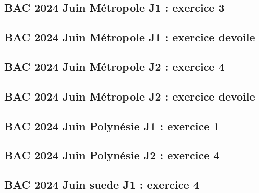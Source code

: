 \documentclass[lang=fr,edition=teacher,layout=sheet]{mxbook}
\begin{document}
\begingroup\endgroup
\par\bigskip
{}\subsection*{BAC 2024 Juin Métropole J1 : exercice 3}
\begingroup\endgroup
\par\bigskip
{}\subsection*{BAC 2024 Juin Métropole J1 : exercice devoile}
\begingroup\endgroup
\par\bigskip
{}\subsection*{BAC 2024 Juin Métropole J2 : exercice 4}
\begingroup\endgroup
\par\bigskip
{}\subsection*{BAC 2024 Juin Métropole J2 : exercice devoile}
\begingroup\endgroup
\par\bigskip
{}\subsection*{BAC 2024 Juin Polynésie J1 : exercice 1}
\begingroup\endgroup
\par\bigskip
{}\subsection*{BAC 2024 Juin Polynésie J2 : exercice 4}
\begingroup\endgroup
\par\bigskip
{}\subsection*{BAC 2024 Juin suede J1 : exercice 4}
\end{document}
